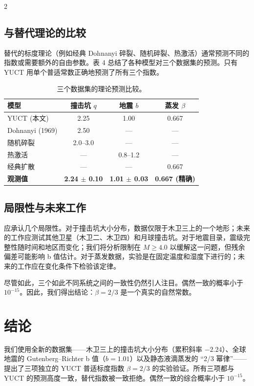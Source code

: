 \documentclass[11pt,a4paper]{article}
\newcommand{\betaf}{\beta}
\begin{document}
\begin{multicols}{2}
		\subsection{与替代理论的比较}
		
		替代的标度理论（例如经典 Dohnanyi 碎裂、随机碎裂、热激活）通常预测不同的指数或需要额外的自由参数。表 4 总结了各种模型对三个数据集的预测。只有 YUCT 用单个普适常数正确地预测了所有三个指数。
		
		\begin{table}[htbp]
			\centering
			\caption{三个数据集的理论预测比较。}
			\label{tab:comparison2}
			\begin{tabular}{lccc}
				\toprule
				\textbf{模型} & \textbf{撞击坑 $q$} & \textbf{地震 $b$} & \textbf{蒸发 $\beta$} \\
				\midrule
				YUCT (本文) & 2.25 & 1.00 & 0.667 \\
				Dohnanyi (1969) & 2.50 & — & — \\
				随机碎裂 & 2.0–3.0 & — & — \\
				热激活 & — & 0.8–1.2 & — \\
				经典扩散 & — & — & 0.667 \\
				\textbf{观测值} & \textbf{2.24 $\pm$ 0.10} & \textbf{1.01 $\pm$ 0.03} & \textbf{0.667 (精确)} \\
				\bottomrule
			\end{tabular}
		\end{table}
		
		\subsection{局限性与未来工作}
		
		应承认几个局限性。对于撞击坑大小分布，数据仅限于木卫三上的一个地形；未来的工作应测试其他卫星（木卫二、木卫四）和月球撞击坑。对于地震目录，震级完整性随时间和地区而变化；我们将分析限制在 \(M \ge 4.0\) 以缓解这一问题，但残余偏差可能影响 b 值估计。对于蒸发数据，实验是在固定温度和湿度下进行的；未来的工作应在变化条件下检验该定律。
		
		尽管如此，三个如此不同系统之间的一致性仍然引人注目。偶然一致的概率小于 \(10^{-15}\)。因此，我们得出结论：\(\betaf = 2/3\) 是一个真实的自然常数。
		
		\section{结论}
		
		我们使用全新的数据集——木卫三上的撞击坑大小分布（累积斜率 \(-2.24\)）、全球地震的 Gutenberg–Richter b 值（\(b = 1.01\)）以及静态液滴蒸发的 “2/3 幂律”——提出了三项独立的 YUCT 普适标度指数 \(\betaf = 2/3\) 的实验验证。所有三项都与 YUCT 的预测高度一致，替代指数被一致拒绝。偶然一致的综合概率小于 \(10^{-15}\)。
		

\end{multicols}
\end{document}

